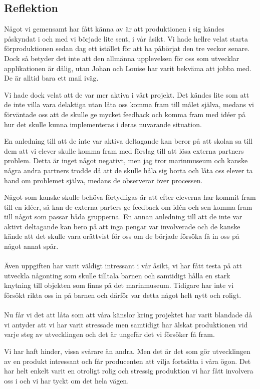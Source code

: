 \documentclass[12pt, titlepage]{article}
\begin{document}
\subsection{Reflektion}
Något vi gemensamt har fått känna av är att produktionen i sig kändes påskyndat i och med vi började lite sent, 
i vår åsikt. Vi hade hellre velat starta förproduktionen sedan dag ett istället för att ha påbörjat den tre veckor senare. 
Dock så betyder det inte att den allmänna upplevelsen för oss som utvecklar applikationen är dålig, 
utan Johan och Louise har varit bekväma att jobba med. De är alltid bara ett mail iväg. 

Vi hade dock velat att de var mer aktiva i vårt projekt. Det kändes lite som att de inte villa vara delaktiga utan låta 
oss komma fram till målet själva, medans vi förväntade oss att de skulle ge mycket feedback och komma fram 
med idéer på hur det skulle kunna implementeras i deras nuvarande situation. 

En anledning till att de inte var aktiva deltagande 
kan beror på att skolan sa till dem att vi elever skulle komma fram med förslag till att lösa externa partners problem. 
Detta är inget något negativt, men jag tror marinmuseum och kanske några andra partners trodde då att de skulle 
håla sig borta och låta oss elever ta hand om problemet själva, medans de observerar över processen. 

Något som kanske skulle behöva förtydligas är att efter eleverna har kommit fram till en idéer, 
så kan de externa parters ge feedback om idén och sen komma fram till något som passar båda grupperna. 
En annan anledning till att de inte var aktivt deltagande kan bero på att inga pengar var involverade och 
de kanske kände att det skulle vara orättvist för oss om de började försöka få in oss på något annat spår.
\\
\\
Även uppgiften har varit väldigt intressant i vår åsikt, vi har fått testa på att utveckla någonting som skulle 
tilltala barnen och samtidigt hålla en stark knytning till objekten som finns på det marinmuseum. 
Tidigare har inte vi försökt rikta oss in på barnen och därför var detta något helt nytt och roligt.
\\
\\
Nu får vi det att låta som att våra känslor kring projektet har varit blandade då vi antyder att vi 
har varit stressade men samtidigt har älskat produktionen vid varje steg av utvecklingen och det är ungefär det vi försöker få fram. 

Vi har haft hinder, vissa svårare än andra. Men det är det som gör utvecklingen av en produkt intressant och får 
producenten att vilja fortsätta i våra ögon. Det har helt enkelt varit en otroligt rolig och 
stressig produktion vi har fått involvera oss i och vi har tyckt om det hela vägen.
\end{document}
